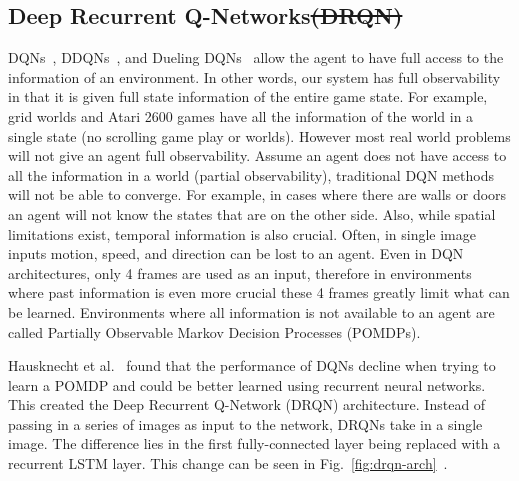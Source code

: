 \documentclass[12pt,american]{report}
\providecommand{\DIFdeltex}[1]{{\protect\color{red}\sout{#1}}}                      %
\providecommand{\DIFdelbegin}{} %
\providecommand{\DIFdelend}{} %
\providecommand{\DIFdel}[1]{\texorpdfstring{\DIFdeltex{#1}}{}} %
\newcommand{\DIFscaledelfig}{0.5}
\newlength{\DIFdelgraphicswidth} %
\newlength{\DIFdelgraphicsheight} %
\newcommand{\DIFdelincludegraphics}[2][]{%
\sbox{\DIFdelgraphicsbox}{\DIFOincludegraphics[#1]{#2}}%
\settoboxwidth{\DIFdelgraphicswidth}{\DIFdelgraphicsbox} %
\settoboxtotalheight{\DIFdelgraphicsheight}{\DIFdelgraphicsbox} %
\scalebox{\DIFscaledelfig}{%
\parbox[b]{\DIFdelgraphicswidth}{\usebox{\DIFdelgraphicsbox}\\[-\baselineskip] \rule{\DIFdelgraphicswidth}{0em}}\llap{\resizebox{\DIFdelgraphicswidth}{\DIFdelgraphicsheight}{%
\setlength{\unitlength}{\DIFdelgraphicswidth}%
\begin{picture}(1,1)%
\thicklines\linethickness{2pt} %
{\color[rgb]{1,0,0}\put(0,0){\framebox(1,1){}}}%
{\color[rgb]{1,0,0}\put(0,0){\line( 1,1){1}}}%
{\color[rgb]{1,0,0}\put(0,1){\line(1,-1){1}}}%
\end{picture}%
}\hspace*{3pt}}} %
} %
\DeclareRobustCommand{\DIFdelbegin}{\DIFOdelbegin \let\includegraphics\DIFdelincludegraphics} %
\DeclareRobustCommand{\DIFdelend}{\DIFOaddend \let\includegraphics\DIFOincludegraphics} %
\begin{document}
\subsection{Deep Recurrent Q-Networks\DIFdelbegin \DIFdel{(DRQN)}\DIFdelend }
\label{sec:drqn}
DQNs~\cite{atari}, DDQNs~\cite{van2016deep}, and Dueling DQNs~\cite{wang2015dueling} allow the agent to have full access to the information of an environment. In other words, our system has full observability in that it is given full state information of the entire game state.  For example, grid worlds and Atari 2600 games have all the information of the world in a single state (no scrolling game play or worlds). However most real world problems will not give an agent full observability. Assume an agent does not have access to all the information in a world (partial observability), traditional DQN methods will not be able to converge. For example, in cases where there are walls or doors an agent will not know the states that are on the other side. Also, while spatial limitations exist, temporal information is also crucial.  Often, in single image inputs motion, speed, and direction can be lost to an agent. Even in DQN architectures, only 4 frames are used as an input, therefore in environments where past information is even more crucial these 4 frames greatly limit what can be learned. Environments where all information is not available to an agent are called Partially Observable Markov Decision Processes (POMDPs).  

Hausknecht et al.~\cite{HausknechtDRQN} found that the performance of DQNs decline when trying to learn a POMDP and could be better learned using recurrent neural networks. This created the Deep Recurrent Q-Network (DRQN) architecture. Instead of passing in a series of images as input to the network, DRQNs take in a single image. The difference lies in the first fully-connected layer being replaced with a recurrent LSTM layer. This change can be seen in Fig.~\ref{fig:drqn-arch}~\cite{HausknechtDRQN}.
\end{document}
